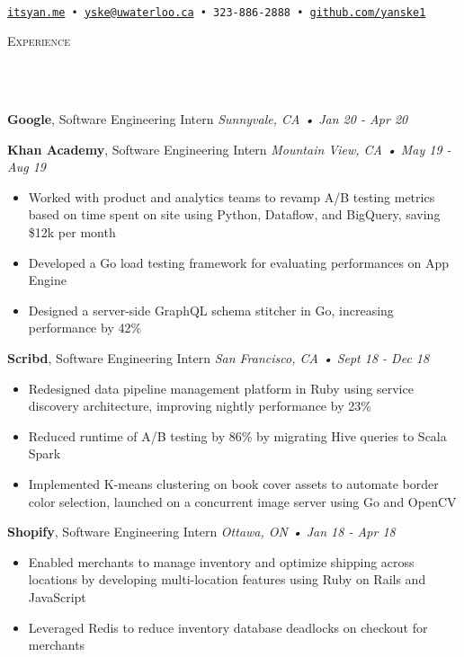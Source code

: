 \documentclass[a4paper, 12pt, hidelinks]{article}
\newcommand{\lineunder} {
    \vspace*{-8pt} \\
    \hrulefill \\
}
\newcommand{\header} [1] {
    \color{bigtext}
    {\hspace*{-4pt}\vspace*{6pt} \textsc{#1}}
    \vspace*{-6pt}
    \color{weaktext}
    \lineunder
    \vspace{6pt}
    \color{bodytext}
}
\newcommand{\nolocheader} [3] {
    \color{bigtext}\textbf{#1}, {#2}
    \color{weaktext}\hfill{\small\textit{#3}}\\
    \vspace{-3mm} \color{bodytext}
}
\newcommand{\jobheader} [4] {
    \nolocheader{#1}{#2}{\small\textit{#3} • \textit{#4}}
}
\begin{document}
\vspace*{-35pt}
\begin{center}
	\text{\fontsize{36}{40} \selectfont \color{bigtext}{Yan Ke}}\\
    \vspace{10pt}
    \color{weaktext}
    \texttt{\href{http://www.itsyan.me}{itsyan.me} •
    \href{mailto:yske@uwaterloo.ca}{yske@uwaterloo.ca} •
    323-886-2888 •
    \href{http://www.github.com/yanske1}{github.com/yanske1}}
\end{center}

\header{Experience}

\jobheader{Google}{Software Engineering Intern}{Sunnyvale, CA}{Jan 20 - Apr 20}
\vspace{6mm}

\jobheader{Khan Academy}{Software Engineering Intern}{Mountain View, CA}{May 19 - Aug 19}
\begin{itemize}[leftmargin=1.8em] \itemsep 1pt \color{bodytext}
    \item Worked with product and analytics teams to revamp A/B testing metrics based on time spent on site
    using Python, Dataflow, and BigQuery, saving \$12k per month
    \item Developed a Go load testing framework for evaluating performances on App Engine
    \item Designed a server-side GraphQL schema stitcher in Go, increasing performance by 42\%
\end{itemize}

\jobheader{Scribd}{Software Engineering Intern}{San Francisco, CA}{Sept 18 - Dec 18}
\begin{itemize}[leftmargin=1.8em] \itemsep 1pt \color{bodytext}
	\item Redesigned data pipeline management platform in Ruby using service discovery architecture,
    improving nightly performance by 23\%
	\item Reduced runtime of A/B testing by 86\% by migrating Hive queries to Scala Spark
	\item Implemented K-means clustering on book cover assets to automate border color selection,
    launched on a concurrent image server using Go and OpenCV
\end{itemize}

\jobheader{Shopify}{Software Engineering Intern}{Ottawa, ON}{Jan 18 - Apr 18}
\begin{itemize}[leftmargin=1.8em] \itemsep 1pt \color{bodytext}
	\item Enabled merchants to manage inventory and optimize shipping across locations by developing
    multi-location features using Ruby on Rails and JavaScript
	\item Leveraged Redis to reduce inventory database deadlocks on checkout for merchants
\end{itemize}
\end{document}
